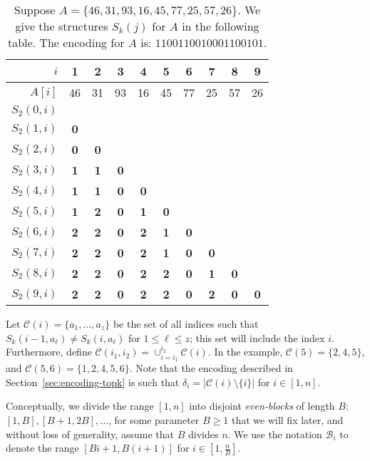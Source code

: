 \documentclass[runningheads]{llncs}
\newcommand{\opset}{\mathcal{C}}
\begin{document}
\begin{table}
\centering
\caption{\label{tab:twoseq}Suppose $A = \{ 46, 31, 93, 16, 45, 77, 25,
  57, 26\}$.  We give the structures $S_k(j)$ for $A$ in the following
  table. The encoding for $A$ is: $1100110010001100101$.}
\begin{tabular}{|r||c|c|c|c|c|c|c|c|c|}
\hline 
   $i$ & 1 & 2 & 3 & 4 & 5 & 6 & 7 & 8 & 9 \\
\hline
   $A[i]$ & 46 & 31 & 93 & 16 & 45 & 77 & 25 & 57 & 26 \\
\hline
\hline
  $S_2(0,i)$ &  &   &   &   &   &   &   &   &    \\
\hline 
  $S_2(1,i)$ & {\bf 0} &   &   &   &   &   &   &   &    \\
\hline 
  $S_2(2,i)$ & {\bf 0} & {\bf 0} &   &   &   &   &   &   &    \\
\hline 
  $S_2(3,i)$ & {\bf 1} & {\bf 1} & {\bf 0} &   &   &   &   &   &    \\
\hline 
  $S_2(4,i)$ & {\bf 1} & {\bf 1} & {\bf 0} & {\bf 0} &   &   &   &   &    \\
\hline 
  $S_2(5,i)$ & {\bf 1} & {\bf 2} & {\bf 0} & {\bf 1} & {\bf 0} &   &   &   &    \\
\hline 
  $S_2(6,i)$ & {\bf 2} & {\bf 2} & {\bf 0} & {\bf 2} & {\bf 1} & {\bf 0} &   &   &    \\
\hline 
  $S_2(7,i)$ & {\bf 2} & {\bf 2} & {\bf 0} & {\bf 2} & {\bf 1} & {\bf 0} & {\bf 0} &   &    \\
\hline 
  $S_2(8,i)$ & {\bf 2} & {\bf 2} & {\bf 0} & {\bf 2} & {\bf 2} & {\bf 0} & {\bf 1} & {\bf 0} &    \\
\hline 
  $S_2(9,i)$ & {\bf 2} & {\bf 2} & {\bf 0} & {\bf 2} & {\bf 2} & {\bf 0} & {\bf 2} & {\bf 0} & {\bf 0}  \\ 
\hline
\end{tabular}
\end{table}


Let $\opset(i) = \{a_1, ..., a_z\}$ be the set of all indices such
that $S_k(i-1,a_\ell) \neq S_k(i,a_\ell)$ for $1 \le \ell \le z$; this
set will include the index $i$.  Furthermore, define $\opset(i_1,i_2)
= \cup_{i = i_1}^{i_2} \opset(i)$.  In the example, $\opset(5) =
\{2,4,5\}$, and $\opset(5,6) = \{1,2,4,5,6\}$.  Note that the encoding
described in Section~\ref{sec:encoding-topk} is such that $\delta_i =
|\opset(i) \setminus\{i\}|$ for $i \in [1,n]$.

Conceptually, we divide the range $[1,n]$ into disjoint
\emph{even-blocks} of length $B$: $[1,B],[B+1, 2B], ...$, for some
parameter $B \ge 1$ that we will fix later, and without loss of
generality, assume that $B$ divides $n$.  We use the notation
$\mathcal{B}_i$ to denote the range $[Bi + 1, B(i+1)]$ for $i \in [1,
  \frac{n}{B}]$.
\end{document}

